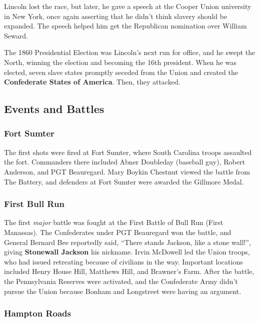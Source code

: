 Lincoln lost the race, but later, he gave a speech at the Cooper Union university in New York,
once again asserting that he didn't think slavery should be expanded.
The speech helped him get the Republican nomination over William Seward.

The 1860 Presidential Election was Lincoln's next run for office, and he swept the North,
winning the election and becoming the 16th president.
When he was elected, seven slave states promptly seceded from the Union
and created the \textbf{Confederate States of America}.
Then, they attacked.


\subsection*{Events and Battles}

\subsubsection*{Fort Sumter}

The first shots were fired at Fort Sumter, where South Carolina troops assaulted the fort.
Commanders there included Abner Doubleday (baseball guy), Robert Anderson, and PGT Beauregard.
Mary Boykin Chestnut viewed the battle from The Battery,
and defenders at Fort Sumter were awarded the Gillmore Medal.

\subsubsection*{First Bull Run}

The first \textit{major} battle was fought at the First Battle of Bull Run (First Manassas).
The Confederates under PGT Beauregard won the battle,
and General Bernard Bee reportedly said, ``There stands Jackson, like a stone wall!'',
giving \textbf{Stonewall Jackson} his nickname.
Irvin McDowell led the Union troops, who had issued retreating because of civilians in the way.
Important locations included Henry House Hill, Matthews Hill, and Brawner's Farm.
After the battle, the Pennsylvania Reserves were activated,
and the Confederate Army didn't pursue the Union because Bonham and Longstreet were having an argument.

\subsubsection*{Hampton Roads}

